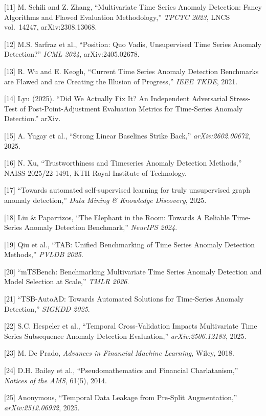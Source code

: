 \documentclass[
]{article}
\begin{document}
{[}11{]} M. Sehili and Z. Zhang, ``Multivariate Time Series Anomaly
Detection: Fancy Algorithms and Flawed Evaluation Methodology,''
\emph{TPCTC 2023}, LNCS vol.~14247, arXiv:2308.13068.

{[}12{]} M.S. Sarfraz et al., ``Position: Quo Vadis, Unsupervised Time
Series Anomaly Detection?'' \emph{ICML 2024}, arXiv:2405.02678.

{[}13{]} R. Wu and E. Keogh, ``Current Time Series Anomaly Detection
Benchmarks are Flawed and are Creating the Illusion of Progress,''
\emph{IEEE TKDE}, 2021.

{[}14{]} Lyu (2025). ``Did We Actually Fix It? An Independent
Adversarial Stress-Test of Post-Point-Adjustment Evaluation Metrics for
Time-Series Anomaly Detection.'' arXiv.

{[}15{]} A. Yugay et al., ``Strong Linear Baselines Strike Back,''
\emph{arXiv:2602.00672}, 2025.

{[}16{]} N. Xu, ``Trustworthiness and Timeseries Anomaly Detection
Methods,'' NAISS 2025/22-1491, KTH Royal Institute of Technology.

{[}17{]} ``Towards automated self-supervised learning for truly
unsupervised graph anomaly detection,'' \emph{Data Mining \& Knowledge
Discovery}, 2025.

{[}18{]} Liu \& Paparrizos, ``The Elephant in the Room: Towards A
Reliable Time-Series Anomaly Detection Benchmark,'' \emph{NeurIPS 2024}.

{[}19{]} Qiu et al., ``TAB: Unified Benchmarking of Time Series Anomaly
Detection Methods,'' \emph{PVLDB 2025}.

{[}20{]} ``mTSBench: Benchmarking Multivariate Time Series Anomaly
Detection and Model Selection at Scale,'' \emph{TMLR 2026}.

{[}21{]} ``TSB-AutoAD: Towards Automated Solutions for Time-Series
Anomaly Detection,'' \emph{SIGKDD 2025}.

{[}22{]} S.C. Hespeler et al., ``Temporal Cross-Validation Impacts
Multivariate Time Series Subsequence Anomaly Detection Evaluation,''
\emph{arXiv:2506.12183}, 2025.

{[}23{]} M. De Prado, \emph{Advances in Financial Machine Learning},
Wiley, 2018.

{[}24{]} D.H. Bailey et al., ``Pseudomathematics and Financial
Charlatanism,'' \emph{Notices of the AMS}, 61(5), 2014.

{[}25{]} Anonymous, ``Temporal Data Leakage from Pre-Split
Augmentation,'' \emph{arXiv:2512.06932}, 2025.
\end{document}
